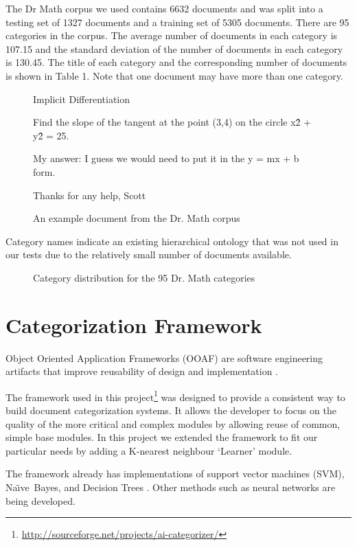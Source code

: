 \documentclass[twocolumn]{article}
\newcommand{\naive}{Na\"\i ve}
\begin{document}
The Dr Math corpus we used contains 6632 documents and was split into a testing 
set of 1327 documents and a training set of 5305 documents.  There are 95 categories 
in the corpus. The average number of documents in each category is 107.15 and the 
standard deviation of the number of documents in each category is 130.45. The title of 
each category and the corresponding number of documents is shown in Table 1. Note 
that one document may have more than one category. 

\begin{figure}
Implicit Differentiation

Find the slope of the tangent at the point (3,4) on the circle 
x\^2 + y\^2 = 25.

My answer: I guess we would need to put it in the y = mx + b form. 

Thanks for any help,
Scott
\caption{An example document from the Dr. Math corpus}
\end{figure}

Category names indicate an existing hierarchical ontology that was not used in our 
tests due to the relatively small number of documents available.

\begin{figure}
\caption{Category distribution for the 95 Dr. Math categories}
\end{figure}


\section{Categorization Framework}

Object Oriented Application Frameworks (OOAF) are software engineering artifacts 
that improve reusability of design and implementation \cite{fayad:97, fayad:99}.

The framework used in this project\footnote{\url{http://sourceforge.net/projects/ai-categorizer/}}
was designed to provide a 
consistent way to build document categorization systems.\cite{williams:02}  It allows the developer to 
focus on the quality of the more critical and complex modules by allowing reuse of 
common, simple base modules. In this project we extended the framework to fit our 
particular needs by adding a K-nearest neighbour `Learner' module. 

The framework already has implementations of support vector machines (SVM), 
\naive\ Bayes, and Decision Trees \cite{yang:99, sebastiani:02}. Other methods such 
as neural networks \cite{calvo:00, calvo:01} are being developed.
\end{document}
